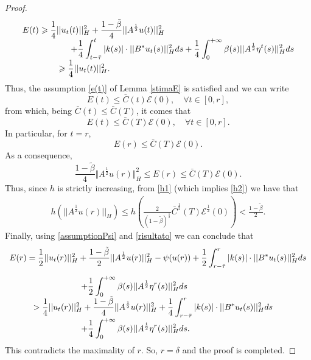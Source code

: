 \documentclass[11pt]{article}
\renewcommand{\geq}{\geqslant}
\renewcommand{\leq}{\leqslant}
\begin{document}
\begin{proof}
$$\begin{array}{l}
\displaystyle{E(t)\geq \frac{1}{4}||u_t(t)||_H^2+\frac{1-\tilde{\beta}}{4}||A^\frac{1}{2}u(t)||_H^2}\\
\displaystyle{\hspace{2 cm}+\frac{1}{4}\int_{t-\bar\tau}^t |k(s)| \cdot ||B^*u_t(s)||_H^2 ds +\frac{1}{4}\int_0^{+\infty} \beta(s) ||A^\frac{1}{2}\eta^t (s)||_H^2 ds}\\
\displaystyle{\hspace{1,5 cm}\geq \frac{1}{4}||u_t(t)||_H^2.}
\end{array}
$$
	Thus, the assumption \eqref{e(t)} of Lemma \ref{stimaE} is satisfied and we can write
	$$E(t)\leq \bar{C}(t)\mathcal{E}(0), \quad \forall t\in [0,r],$$
	from which, being $\bar{C}(t)\leq \bar{C}(T)$, it comes that
	$$E(t)\leq \bar{C}(T)\mathcal{E}(0),\quad \forall t\in [0,r].$$
	In particular, for $t=r$,
	$$E(r)\leq \bar{C}(T)\mathcal{E}(0).$$
	As a consequence, $$\frac{1-\tilde{\beta}}{4} \Vert A^{\frac 1 2} u(r)\Vert^2_H\leq E(r)\leq \bar{C}(T)\mathcal{E}(0).$$
	Thus, since $h$ is strictly increasing, from \eqref{h1} (which implies \eqref{h2}) we have that
	\begin{equation}\label{risultato}
		\begin{array}{l}
			\displaystyle{ h(||A^\frac{1}{2}u(r)||_H)\leq h\left( \frac{2}{(1-\tilde{\beta})^\frac{1}{2}}\bar{C}^\frac{1}{2}(T)\mathcal{E}^\frac{1}{2}(0)\right) <\frac{1-\tilde{\beta}}{2}.}
		\end{array}
	\end{equation}
	Finally, using \eqref{assumptionPsi} and \eqref{risultato} we can conclude that
	$$
	\begin{array}{l}
		\vspace{0.3cm}\displaystyle{ E(r)=
			\frac{1}{2}||u_t(r)||_H^2+\frac{1-\tilde{\beta}}{2}||A^\frac{1}{2}u(r)||_H^2-\psi(u(r))+\frac{1}{2}\int_{r-\bar\tau}^r|k(s)|\cdot ||B^*u_t(s)||^2_H ds}\\
		\hspace{3 cm}
		\displaystyle { +\frac{1}{2}\int_0^{+\infty} \beta(s) ||A^\frac{1}{2} \eta^r(s)||_H^2 ds}\\
		\hspace{1 cm} \displaystyle{
			>\frac{1}{4}||u_t(r)||_H^2+\frac{1-\tilde{\beta}}{4}||A^\frac{1}{2}u(r)||_H^2+\frac{1}{4}\int_{r-\bar\tau}^r|k(s)| \cdot ||B^*u_t(s)||_H^2 ds}\\
		\hspace{3 cm}
		\displaystyle{ +\frac{1}{4}\int_0^{+\infty} \beta(s) ||A^\frac{1}{2} \eta^r(s)||_H^2 ds.}
	\end{array}
	$$
	This contradicts the maximality of $r$. So, $r=\delta$ and the proof is completed.
\end{proof}
\end{document}
